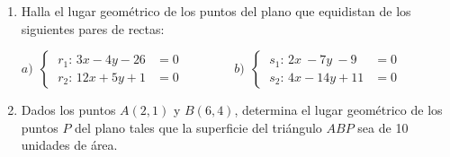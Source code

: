 \vspace{5mm}
\begin{enumerate}


\item	Halla el lugar geométrico de los puntos del plano que equidistan de los siguientes pares de rectas:

\vspace{3mm} $a)\ \ \begin{cases} \ r_1:\, 3x-4y-26&=0 \\ \ r_2:\, 12x+5y+1&=0 \end{cases} \qquad \qquad b)\ \ \begin{cases} \ s_1:\,  2x\ -7y\ -9&=0 \\ \ s_2:\, 4x-14y+11&=0 \end{cases}$


\vspace{-4mm}
\begin{flushright}
\begin{footnotesize} \textcolor{gris}{}	\end{footnotesize}
\end{flushright}

\vspace{-6mm}
\begin{flushright}
\begin{footnotesize} \textcolor{gris}{}	\end{footnotesize}
\end{flushright}

\item	Dados los puntos $A(2,1)$ y $B(6,4)$, determina el lugar geométrico de los puntos $P$ del plano tales que la superficie del triángulo $ABP$ sea de 10 unidades de área.

\vspace{-6mm}
\begin{flushright}
\begin{footnotesize} \textcolor{gris}{}	\end{footnotesize}
\end{flushright}
\vspace{-6mm}
\begin{flushright}
\begin{footnotesize} \textcolor{gris}{}	\end{footnotesize}
\end{flushright}


\end{enumerate}
